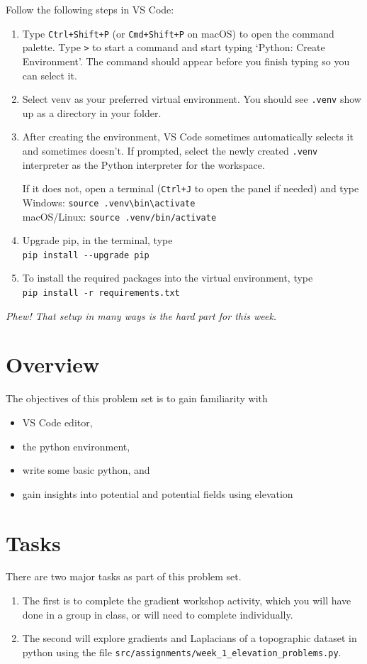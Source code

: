 \documentclass[final,a4paper,12pt]{article}
\begin{document}
Follow the following steps in VS Code:
\begin{enumerate}
  \item Type \verb-Ctrl+Shift+P- (or \verb-Cmd+Shift+P- on macOS) to open the command palette.  Type \verb+>+ to start a command and start typing `Python: Create Environment'.  The command should appear before you finish typing so you can select it.
  \item Select venv as your preferred virtual environment.  You should see \verb+.venv+ show up as a directory in your folder.
  \item After creating the environment, VS Code sometimes automatically selects it and sometimes doesn't.  If prompted, select the newly created \verb+.venv+ interpreter as the Python interpreter for the workspace.
  
  If it does not, open a terminal (\verb-Ctrl+J- to open the panel if needed) and type\\ Windows: \verb+source .venv\bin\activate+\\ macOS/Linux: \verb+source .venv/bin/activate+
  \item Upgrade pip, in the terminal, type\\ \verb+pip install --upgrade pip+
  \item To install the required packages into the virtual environment, type\\ \verb+pip install -r requirements.txt+
\end{enumerate}

\textit{Phew! That setup in many ways is the hard part for this week.}

\section*{Overview}
The objectives of this problem set is to gain familiarity with
\begin{itemize}
  \item VS Code editor,
  \item the python environment, 
  \item write some basic python, and
  \item gain insights into potential and potential fields using elevation
\end{itemize}

\section*{Tasks}
There are two major tasks as part of this problem set.
\begin{enumerate}
  \item The first is to complete the gradient workshop activity, which you will have done in a group in class, or will need to complete individually.

  \item The second will explore gradients and Laplacians of a topographic dataset in python using the file \verb+src/assignments/week_1_elevation_problems.py+.
\end{enumerate}
\end{document}
